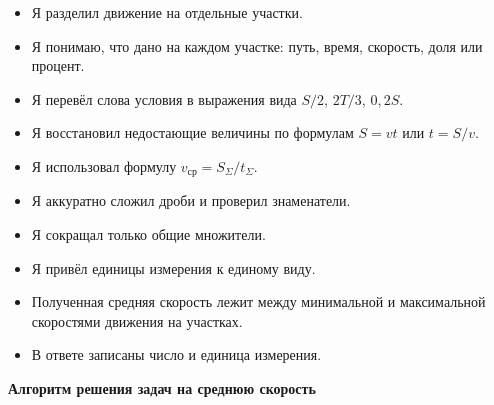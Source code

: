 \documentclass[a4paper,12pt]{article}
\newcommand{\checkitem}[1]{\item[$\square$] #1}
\begin{document}
\begin{itemize}[leftmargin=8mm,itemsep=4pt]

\checkitem{Я разделил движение на отдельные участки.}

\checkitem{Я понимаю, что дано на каждом участке: путь, время, скорость, доля или процент.}

\checkitem{Я перевёл слова условия в выражения вида $S/2$, $2T/3$, $0{,}2S$.}

\checkitem{Я восстановил недостающие величины по формулам $S=vt$ или $t=S/v$.}

\checkitem{Я использовал формулу $v_{\text{ср}}=S_{\Sigma}/t_{\Sigma}$.}

\checkitem{Я аккуратно сложил дроби и проверил знаменатели.}

\checkitem{Я сокращал только общие множители.}

\checkitem{Я привёл единицы измерения к единому виду.}

\checkitem{Полученная средняя скорость лежит между минимальной и максимальной скоростями движения на участках.}

\checkitem{В ответе записаны число и единица измерения.}

\end{itemize}


\clearpage
\thispagestyle{empty}

\begin{center}
{\Large\bfseries\color{darkaccent}
Алгоритм решения задач на среднюю скорость
}
\end{center}

\vspace{6mm}
\end{document}
